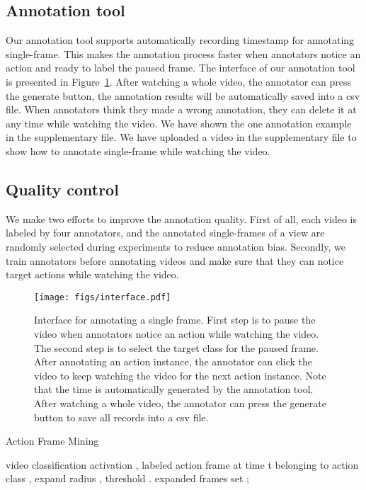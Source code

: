 \documentclass[runningheads]{llncs}
\begin{document}
	\subsection{Annotation tool}
	Our annotation tool supports automatically recording timestamp for annotating single-frame. This makes the annotation process faster when annotators notice an action and ready to label the paused frame. The interface of our annotation tool is presented in Figure~\ref{fig:ann}. After watching a whole video, the annotator can press the generate button, the annotation results will be automatically saved into a csv file. When annotators think they made a wrong annotation, they can delete it at any time while watching the video. We have shown the one annotation example in the supplementary file. We have uploaded a video in the supplementary file to show how to annotate single-frame while watching the video.
	
	\subsection{Quality control}
	We make two efforts to improve the annotation quality. First of all, each video is labeled by four annotators, and the annotated single-frames of a view are randomly selected during experiments to reduce annotation bias. Secondly, we train annotators before annotating videos and make sure that they can notice target actions while watching the video.
	
	\begin{figure}[!t]
		\begin{center}
			\texttt{[image: figs/interface.pdf]}
		\end{center}
		\caption{Interface for annotating a single frame. First step is to pause the video when annotators notice an action while watching the video. The second step is to select the target class for the paused frame. After annotating an action instance, the annotator can click the video to keep watching the video for the next action instance. Note that the time is automatically generated by the annotation tool. After watching a whole video, the annotator can press the generate button to save all records into a csv file.  }
		\label{fig:ann}
	\end{figure}
	
	
	\begin{algorithm}[]
		
		\begin{algorithmic}[1]
			\caption{Action Frame Mining}\label{alg1}
			
			  video classification activation , labeled action frame at time t belonging to action class , expand radius , threshold . 
			 expanded frames set  
			\State{}
			 ;
			\For{} 
			\State{}
			\State{}
			\State{}
			\State{}
			\EndIf
			\State{}
			\EndFor
			
			\EndFunction
		\end{algorithmic}
	\end{algorithm}
	
\end{document}

